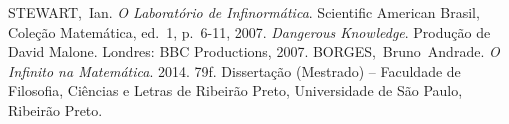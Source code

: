 \documentclass[journal,transmag]{IEEEtran}
\begin{document}

%
%
%
\begin{thebibliography}{1}

STEWART,~Ian. \emph{O Laboratório de Infinormática}. Scientific American Brasil, Coleção Matemática, ed.~1, p.~6-11, 2007.
\emph{Dangerous Knowledge}. Produção de David Malone. Londres: BBC Productions, 2007.
BORGES,~Bruno~Andrade. \emph{O Infinito na Matemática}. 2014. 79f. Dissertação (Mestrado) -- Faculdade de Filosofia, Ciências e Letras de Ribeirão Preto, Universidade de São Paulo, Ribeirão Preto.

\end{thebibliography}

% 


\end{document}
